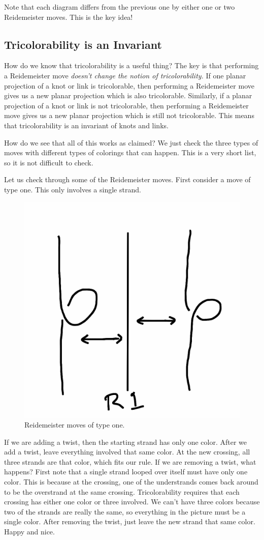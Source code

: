 \documentclass[12pt,letterpaper]{article}
\theoremstyle{definition}
\begin{document}
Note that each diagram differs from the previous one by either one or two Reidemeister moves. 
This is the key idea!

\subsection*{Tricolorability is an Invariant}

How do we know that tricolorability is a useful thing?
The key is that performing a Reidemeister move \emph{doesn't change the notion of tricolorability.}
If one planar projection of a knot or link is tricolorable, then performing a Reidemeister move gives us a new planar projection which is also tricolorable.
Similarly, if a planar projection of a knot or link is not tricolorable, then performing a Reidemeister move gives us a new planar projection which is still not tricolorable.
This means that tricolorability is an invariant of knots and links.

How do we see that all of this works as claimed?
We just check the three types of moves with different types of colorings that can happen.
This is a very short list, so it is not difficult to check.

Let us check through some of the Reidemeister moves.
First consider a move of type one.
This only involves a single strand.

\begin{figure}[h]
    \centering
    \includegraphics[width=.3\textwidth]{knotpics/r1.png}
    \caption{Reidemeister moves of type one.}
\end{figure}

If we are adding a twist, then the starting strand has only one color.
After we add a twist, leave everything involved that same color.
At the new crossing, all three strands are that color, which fits our rule.
If we are removing a twist, what happens?
First note that a single strand looped over itself must have only one color. This is because at the crossing, one of the understrands comes back around to be the overstrand at the same crossing.
Tricolorability requires that each crossing has either one color or three involved.
We can't have three colors because two of the strands are really the same, so everything in the picture must be a single color.
After removing the twist, just leave the new strand that same color.
Happy and nice.
\end{document}
